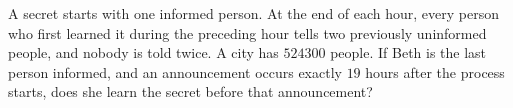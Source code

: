 A secret starts with one informed person. At the end of each hour, every person who first learned it during the preceding hour tells two previously uninformed people, and nobody is told twice. A city has $524300$ people. If Beth is the last person informed, and an announcement occurs exactly $19$ hours after the process starts, does she learn the secret before that announcement?
